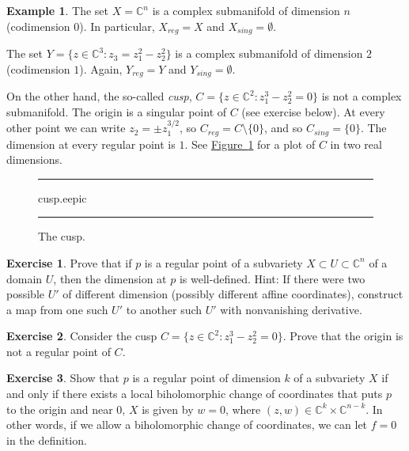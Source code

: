 \documentclass[12pt,openany]{book}
\newcommand{\C}{{\mathbb{C}}}
\newcommand{\myindex}[1]{#1\index{#1}}
\theoremstyle{plain}
\theoremstyle{remark}
\theoremstyle{definition}
\newenvironment{exbox}{%
    \def\FrameCommand{\vrule width 1pt \relax\hspace{10pt}}%
    \MakeFramed{\advance\hsize-\width\FrameRestore}%
}{%
    \endMakeFramed
}
\newenvironment{myfig}{%
\begin{figure}[h!t]
\noindent\rule{\textwidth}{0.5pt}\vspace{12pt}\par\centering}%
{\par\noindent\rule{\textwidth}{0.5pt}
\end{figure}}
\theoremstyle{exercise}
\newtheorem{exercise}{Exercise}[section]
\theoremstyle{example}
\newtheorem{example}[thm]{Example}
\newcommand{\figureref}[1]{\hyperref[#1]{Figure~\ref*{#1}}}
\begin{document}
\begin{example}
The set $X = \C^n$ is a complex submanifold of dimension $n$
(codimension $0$).
In particular, $X_{\mathit{reg}} = X$ and $X_{\mathit{sing}} = \emptyset$.

The set $Y = \bigl\{ z \in \C^3 : z_3 = z_1^2 - z_2^2 \bigr\}$ is a complex submanifold of
dimension $2$ (codimension $1$).  Again,
$Y_{\mathit{reg}} = Y$ and $Y_{\mathit{sing}} = \emptyset$.

On the other hand, the so-called \emph{\myindex{cusp}},
$C = \bigl\{ z \in \C^2 : z_1^3-z_2^2 = 0 \bigr\}$ is not a complex
submanifold.  The origin is a singular point of $C$
(see exercise below).
At every other point we can write $z_2 = \pm z_1^{3/2}$,
so $C_{\mathit{reg}} = C \setminus \{0\}$, and so $C_{\mathit{sing}} = \{ 0
\}$.
The dimension at every regular point is $1$.
See \figureref{fig:cusp} for a
plot of $C$ in two real dimensions.

\begin{myfig}
\medskip
{cusp.eepic}
\bigskip
\caption{The cusp.\label{fig:cusp}}
\end{myfig}
\end{example}


\begin{exbox}
\begin{exercise}
Prove that if $p$ is a regular point of a subvariety $X \subset U \subset
\C^n$ of a domain $U$, then the dimension at $p$ is well-defined.  Hint: If there were two possible
$U'$ of different dimension (possibly different affine coordinates), construct a map
from one such $U'$ to another such $U'$ with nonvanishing derivative.
\end{exercise}

\begin{exercise}
Consider the cusp
$C = \bigl\{ z \in \C^2 : z_1^3-z_2^2 = 0 \bigr\}$.  Prove that
the origin is not a regular point of $C$.
\end{exercise}

\begin{exercise}
Show that $p$ is a regular point of dimension $k$ of a subvariety $X$
if and only if there
exists a local biholomorphic change of coordinates that puts $p$ to the
origin and near $0$, $X$ is given by $w=0$, where $(z,w) \in \C^{k} \times
\C^{n-k}$.  In other words, if we allow a biholomorphic change of
coordinates, we can let $f=0$ in the definition.
\end{exercise}
\end{exbox}
\end{document}
